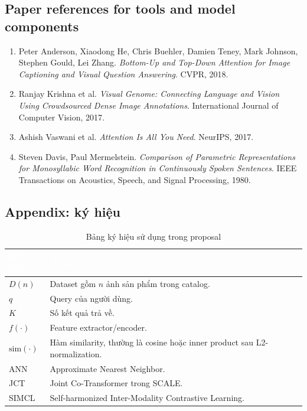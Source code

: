 \documentclass[12pt,a4paper]{article}
\begin{document}
\subsection{Paper references for tools and model components}
\begin{enumerate}[resume]
  \item Peter Anderson, Xiaodong He, Chris Buehler, Damien Teney, Mark Johnson, Stephen Gould, Lei Zhang. \emph{Bottom-Up and Top-Down Attention for Image Captioning and Visual Question Answering}. CVPR, 2018.
  \item Ranjay Krishna et al. \emph{Visual Genome: Connecting Language and Vision Using Crowdsourced Dense Image Annotations}. International Journal of Computer Vision, 2017.
  \item Ashish Vaswani et al. \emph{Attention Is All You Need}. NeurIPS, 2017.
  \item Steven Davis, Paul Mermelstein. \emph{Comparison of Parametric Representations for Monosyllabic Word Recognition in Continuously Spoken Sentences}. IEEE Transactions on Acoustics, Speech, and Signal Processing, 1980.
\end{enumerate}

\subsection{Appendix: ký hiệu}
\begin{table}[htbp]
\centering
\begin{tabularx}{\linewidth}{@{}L{2.6cm}Y@{}}
\toprule
{}
\textcolor{white}{\textbf{Ký hiệu}} & \textcolor{white}{\textbf{Ý nghĩa}} \\
\midrule
$D(n)$ & Dataset gồm $n$ ảnh sản phẩm trong catalog. \\
$q$ & Query của người dùng. \\
$K$ & Số kết quả trả về. \\
$f(\cdot)$ & Feature extractor/encoder. \\
$\mathrm{sim}(\cdot)$ & Hàm similarity, thường là cosine hoặc inner product sau L2-normalization. \\
ANN & Approximate Nearest Neighbor. \\
JCT & Joint Co-Transformer trong SCALE. \\
SIMCL & Self-harmonized Inter-Modality Contrastive Learning. \\
\bottomrule
\end{tabularx}
\caption{Bảng ký hiệu sử dụng trong proposal}
\end{table}
\end{document}
